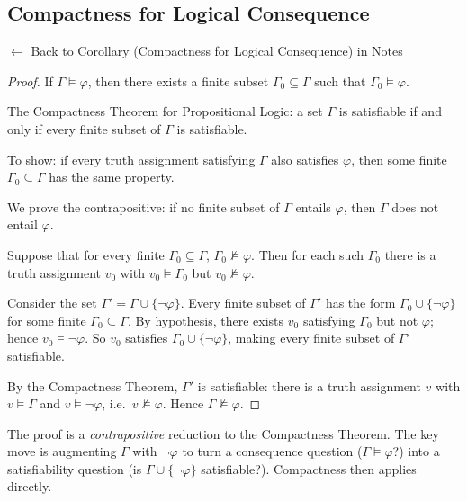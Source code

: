 
\subsection*{Compactness for Logical Consequence}
\label{prf:compactness-consequence-old}

\begin{remark*}[Return]
$\leftarrow$ Back to Corollary (Compactness for Logical Consequence) in Notes
\end{remark*}

\begin{proof}
\Claim If $\Gamma \models \varphi$, then there exists a finite subset $\Gamma_0 \subseteq \Gamma$ such that $\Gamma_0 \models \varphi$.

\Given The Compactness Theorem for Propositional Logic: a set $\Gamma$ is
satisfiable if and only if every finite subset of $\Gamma$ is satisfiable.

\Goal To show: if every truth assignment satisfying $\Gamma$ also satisfies
$\varphi$, then some finite $\Gamma_0 \subseteq \Gamma$ has the same property.

\Strategy We prove the contrapositive: if no finite subset of $\Gamma$
entails $\varphi$, then $\Gamma$ does not entail $\varphi$.

Suppose that for every finite $\Gamma_0 \subseteq \Gamma$, $\Gamma_0
\not\models \varphi$. Then for each such $\Gamma_0$ there is a truth assignment
$v_0$ with $v_0 \models \Gamma_0$ but $v_0 \not\models \varphi$.

Consider the set $\Gamma' = \Gamma \cup \{\neg\varphi\}$. Every finite subset
of $\Gamma'$ has the form $\Gamma_0 \cup \{\neg\varphi\}$ for some finite
$\Gamma_0 \subseteq \Gamma$. By hypothesis, there exists $v_0$ satisfying
$\Gamma_0$ but not $\varphi$; hence $v_0 \models \neg\varphi$. So $v_0$
satisfies $\Gamma_0 \cup \{\neg\varphi\}$, making every finite subset of
$\Gamma'$ satisfiable.

By the Compactness Theorem, $\Gamma'$ is satisfiable: there is a truth
assignment $v$ with $v \models \Gamma$ and $v \models \neg\varphi$, i.e.\ $v
\not\models \varphi$. Hence $\Gamma \not\models \varphi$. \AsReq
\end{proof}

\begin{remark*}
The proof is a \emph{contrapositive} reduction to the Compactness Theorem. The
key move is augmenting $\Gamma$ with $\neg\varphi$ to turn a consequence
question ($\Gamma \models \varphi$?) into a satisfiability question (is
$\Gamma \cup \{\neg\varphi\}$ satisfiable?). Compactness then applies
directly.
\end{remark*}

